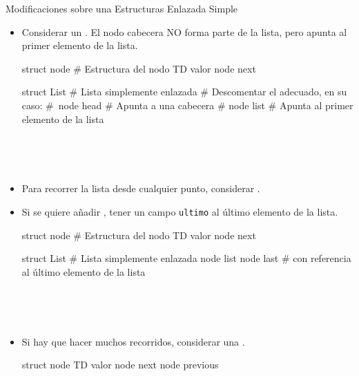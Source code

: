 \documentclass[10pt,envcountsect,spanish]{beamer}
\begin{document}
\begin{frame}{Modificaciones sobre una Estructuras Enlazada Simple}

\begin{itemize}
\item Considerar un . El nodo cabecera NO forma parte de la lista, pero apunta al primer elemento de la lista.

\begin{pyverbatim}
struct node  # Estructura del nodo
    TD valor
    node next

struct List  # Lista simplemente enlazada
  # Descomentar el adecuado, en su caso:
  # node head # Apunta a una cabecera
  # node list # Apunta al primer elemento de la lista
\end{pyverbatim}

\

\


\item Para recorrer la lista desde cualquier punto, considerar .


\framebreak


\item Si se quiere añadir , tener un campo \texttt{ultimo} al último elemento de la lista.

\begin{pyverbatim}
struct node  # Estructura del nodo
    TD valor
    node next

struct List  # Lista simplemente enlazada
  node list
  node last # con referencia al último elemento de la lista
\end{pyverbatim}


\

\




\item Si hay que hacer muchos recorridos, considerar una .


\begin{pyverbatim}
struct node 
   TD valor
   node next
   node previous
\end{pyverbatim}


\end{itemize}

\end{frame}
\end{document}
